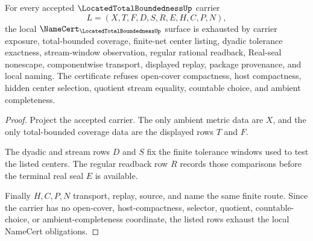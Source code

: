 \begin{theorem}
\label{thm:located-total-boundedness-namecert-obligations}
For every accepted $\LocatedTotalBoundednessUp$ carrier
$$
L=(X,T,F,D,S,R,E,H,C,P,N),
$$
the local $\NameCert_{\LocatedTotalBoundednessUp}$ surface is exhausted by carrier exposure, total-bounded coverage, finite-net center listing, dyadic tolerance exactness, stream-window observation, regular rational readback, Real-seal nonescape, componentwise transport, displayed replay, package provenance, and local naming. The certificate refuses open-cover compactness, host compactness, hidden center selection, quotient stream equality, countable choice, and ambient completeness.
\end{theorem}
\begin{proof}
Project the accepted carrier. The only ambient metric data are $X$, and the only total-bounded coverage data are the displayed rows $T$ and $F$.

The dyadic and stream rows $D$ and $S$ fix the finite tolerance windows used to test the listed centers. The regular readback row $R$ records those comparisons before the terminal real seal $E$ is available.

Finally $H,C,P,N$ transport, replay, source, and name the same finite route. Since the carrier has no open-cover, host-compactness, selector, quotient, countable-choice, or ambient-completeness coordinate, the listed rows exhaust the local NameCert obligations.
\end{proof}

